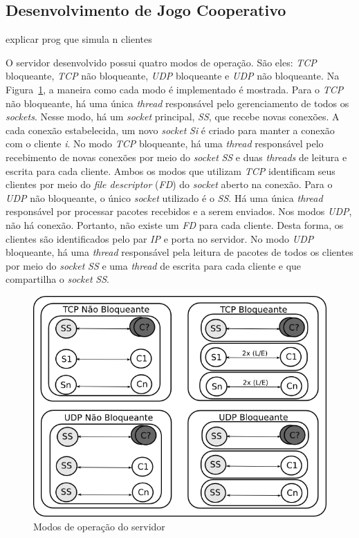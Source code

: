 \documentclass[12pt]{article}
\begin{document}
\subsection{Desenvolvimento de Jogo Cooperativo} \label{sub:desenvolvimento}

explicar prog que simula n clientes

O servidor desenvolvido possui quatro modos de operação. São eles: \emph{TCP} bloqueante, \emph{TCP} não bloqueante, \emph{UDP} bloqueante e \emph{UDP} não bloqueante. Na Figura~\ref{fig:server}, a maneira como cada modo é implementado é mostrada. Para o \emph{TCP} não bloqueante, há uma única \emph{thread} responsável pelo gerenciamento de todos os \emph{sockets}. Nesse modo, há um \emph{socket} principal, \emph{SS}, que recebe novas conexões. A cada conexão estabelecida, um novo \emph{socket} \emph{Si} é criado para manter a conexão com o cliente \emph{i}. No modo \emph{TCP} bloqueante, há uma \emph{thread} responsável pelo recebimento de novas conexões por meio do \emph{socket} \emph{SS} e duas \emph{threads} de leitura e escrita para cada cliente. Ambos os modos que utilizam \emph{TCP} identificam seus clientes por meio do \emph{file descriptor} (\emph{FD}) do \emph{socket} aberto na conexão. Para o \emph{UDP} não bloqueante, o único \emph{socket} utilizado é o \emph{SS}. Há uma única \emph{thread} responsável por processar pacotes recebidos e a serem enviados. Nos modos \emph{UDP}, não há conexão. Portanto, não existe um \emph{FD} para cada cliente. Desta forma, os clientes são identificados pelo par \emph{IP} e porta no servidor. No modo \emph{UDP} bloqueante, há uma \emph{thread} responsável pela leitura de pacotes de todos os clientes por meio do \emph{socket} \emph{SS} e uma \emph{thread} de escrita para cada cliente e que compartilha o \emph{socket} \emph{SS}. 

\begin{figure}[ht]
\centering
\includegraphics[width=.8\textwidth]{img/server.png}
\caption{Modos de operação do servidor}
\label{fig:server}
\end{figure}
\end{document}
